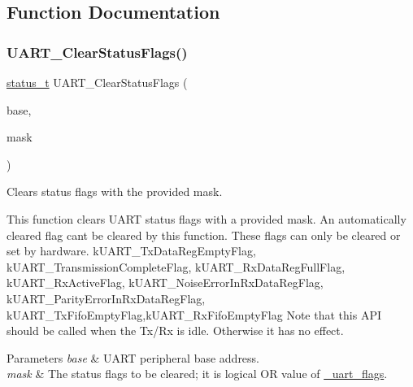 \subsection{Function Documentation}
\mbox{\label{group__uart__driver_gacc4cb85534361f836edca9454a6426c6}} 
\subsubsection{\texorpdfstring{UART\_ClearStatusFlags()}{UART\_ClearStatusFlags()}}
{\footnotesize\ttfamily \mbox{\hyperlink{group__ksdk__common_gaaabdaf7ee58ca7269bd4bf24efcde092}{status\+\_\+t}} U\+A\+R\+T\+\_\+\+Clear\+Status\+Flags (\begin{DoxyParamCaption}\item[{\mbox{\hyperlink{struct_u_a_r_t___type}{U\+A\+R\+T\+\_\+\+Type}} $\ast$}]{base,  }\item[{uint32\+\_\+t}]{mask }\end{DoxyParamCaption})}



Clears status flags with the provided mask. 

This function clears U\+A\+RT status flags with a provided mask. An automatically cleared flag can\textquotesingle{}t be cleared by this function. These flags can only be cleared or set by hardware. k\+U\+A\+R\+T\+\_\+\+Tx\+Data\+Reg\+Empty\+Flag, k\+U\+A\+R\+T\+\_\+\+Transmission\+Complete\+Flag, k\+U\+A\+R\+T\+\_\+\+Rx\+Data\+Reg\+Full\+Flag, k\+U\+A\+R\+T\+\_\+\+Rx\+Active\+Flag, k\+U\+A\+R\+T\+\_\+\+Noise\+Error\+In\+Rx\+Data\+Reg\+Flag, k\+U\+A\+R\+T\+\_\+\+Parity\+Error\+In\+Rx\+Data\+Reg\+Flag, k\+U\+A\+R\+T\+\_\+\+Tx\+Fifo\+Empty\+Flag,k\+U\+A\+R\+T\+\_\+\+Rx\+Fifo\+Empty\+Flag Note that this A\+PI should be called when the Tx/\+Rx is idle. Otherwise it has no effect.


\begin{DoxyParams}{Parameters}
{\em base} & U\+A\+RT peripheral base address. \\
\hline
{\em mask} & The status flags to be cleared; it is logical OR value of \mbox{\hyperlink{group__uart__driver_ga259a53f363288115306a45d08fc66eb8}{\+\_\+uart\+\_\+flags}}. \\
\hline
\end{DoxyParams}

